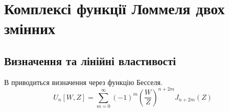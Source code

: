 \chapter{Комплексі функції Ломмеля двох змінних}
\label{ch:lommel}

\section{Визначення та лінійні властивості}

В \cite{imp:Boersma1961} приводиться визначення через функцію Бесселя.
%
\begin{equation}
U_n \left[ W, Z \right] = \sum \limits_{m = 0}^{\infty} (-1)^m
\left( \frac{W}{Z} \right)^{n + 2m} J_{n + 2m} (Z)
\end{equation}

